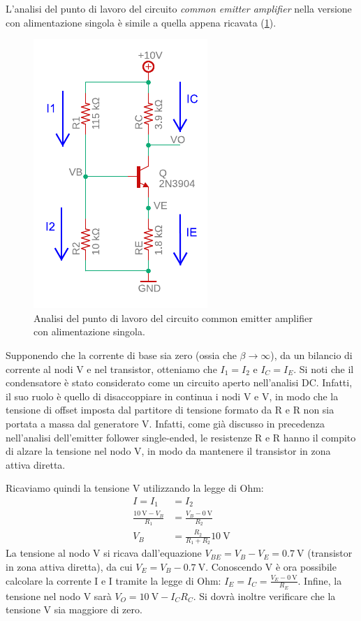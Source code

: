 \noindent
L'analisi del punto di lavoro del circuito \textit{common emitter amplifier} nella versione con alimentazione singola è simile a quella appena ricavata (\Fig\ref{fig:commonemitter_se_DC}).
\begin{figure}[h!]
	\centering
	\includegraphics[width=0.4\linewidth]{./OtherFiles/Laboratorio 3/common emitter_se-punto di lavoro-printout}
	\caption{Analisi del punto di lavoro del circuito common emitter amplifier con alimentazione singola.}
	\label{fig:commonemitter_se_DC}
\end{figure}
Supponendo che la corrente di base sia zero (ossia che $\beta\to\infty$), da un bilancio di corrente al nodi V e nel transistor, otteniamo che $I_1=I_2$ e $I_C=I_E$. Si noti che il condensatore è stato considerato come un circuito aperto nell'analisi DC. Infatti, il suo ruolo è quello di disaccoppiare in continua i nodi V e V, in modo che la tensione di offset imposta dal partitore di tensione formato da R e R non sia portata a massa dal generatore V. Infatti, come già discusso in precedenza nell'analisi dell'emitter follower single-ended, le resistenze R e R hanno il compito di alzare la tensione nel nodo V, in modo da mantenere il transistor in zona attiva diretta.

\noindent
Ricaviamo quindi la tensione V utilizzando la legge di Ohm:
\begin{equation}
	\begin{split}
		I=I_1&=I_2 \\
		\frac{\SI{10}{\volt}-V_B}{R_1}&=\frac{V_B-\SI{0}{\volt}}{R_2} \\
		V_B&=\frac{R_2}{R_1+R_2}\SI{10}{\volt}
	\end{split}
\end{equation}
La tensione al nodo V si ricava dall'equazione $V_{BE}=V_B-V_E=\SI{0.7}{\volt}$ (transistor in zona attiva diretta), da cui $V_E=V_B-\SI{0.7}{\volt}$. Conoscendo V è ora possibile calcolare la corrente I e I tramite la legge di Ohm: $I_E=I_C=\frac{V_E-\SI{0}{\volt}}{R_E}$. 
Infine, la tensione nel nodo V sarà $V_O=\SI{10}{\volt}-I_CR_C$. Si dovrà inoltre verificare che la tensione V sia maggiore di zero.

